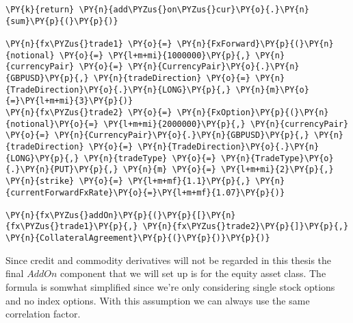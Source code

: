 \begin{tcolorbox}[breakable, size=fbox, boxrule=1pt, pad at break*=1mm,colback=cellbackground, colframe=cellborder]
\begin{Verbatim}[commandchars=\\\{\}]
    \PY{k}{return} \PY{n}{add\PYZus{}on\PYZus{}cur}\PY{o}{.}\PY{n}{sum}\PY{p}{(}\PY{p}{)}

\PY{n}{fx\PYZus{}trade1} \PY{o}{=} \PY{n}{FxForward}\PY{p}{(}\PY{n}{notional} \PY{o}{=} \PY{l+m+mi}{1000000}\PY{p}{,} \PY{n}{currencyPair} \PY{o}{=} \PY{n}{CurrencyPair}\PY{o}{.}\PY{n}{GBPUSD}\PY{p}{,} \PY{n}{tradeDirection} \PY{o}{=} \PY{n}{TradeDirection}\PY{o}{.}\PY{n}{LONG}\PY{p}{,} \PY{n}{m}\PY{o}{=}\PY{l+m+mi}{3}\PY{p}{)}
\PY{n}{fx\PYZus{}trade2} \PY{o}{=} \PY{n}{FxOption}\PY{p}{(}\PY{n}{notional}\PY{o}{=} \PY{l+m+mi}{2000000}\PY{p}{,} \PY{n}{currencyPair} \PY{o}{=} \PY{n}{CurrencyPair}\PY{o}{.}\PY{n}{GBPUSD}\PY{p}{,} \PY{n}{tradeDirection} \PY{o}{=} \PY{n}{TradeDirection}\PY{o}{.}\PY{n}{LONG}\PY{p}{,} \PY{n}{tradeType} \PY{o}{=} \PY{n}{TradeType}\PY{o}{.}\PY{n}{PUT}\PY{p}{,} \PY{n}{m} \PY{o}{=} \PY{l+m+mi}{2}\PY{p}{,} \PY{n}{strike} \PY{o}{=} \PY{l+m+mf}{1.1}\PY{p}{,} \PY{n}{currentForwardFxRate}\PY{o}{=}\PY{l+m+mf}{1.07}\PY{p}{)}

\PY{n}{fx\PYZus{}addOn}\PY{p}{(}\PY{p}{[}\PY{n}{fx\PYZus{}trade1}\PY{p}{,} \PY{n}{fx\PYZus{}trade2}\PY{p}{]}\PY{p}{,} \PY{n}{CollateralAgreement}\PY{p}{(}\PY{p}{)}\PY{p}{)}
\end{Verbatim}
\end{tcolorbox}

    Since credit and commodity derivatives will not be regarded in this
thesis the final \(AddOn\) component that we will set up is for the
equity asset class. The formula is somwhat simplified since we're only
considering single stock options and no index options. With this
assumption we can always use the same correlation factor.

